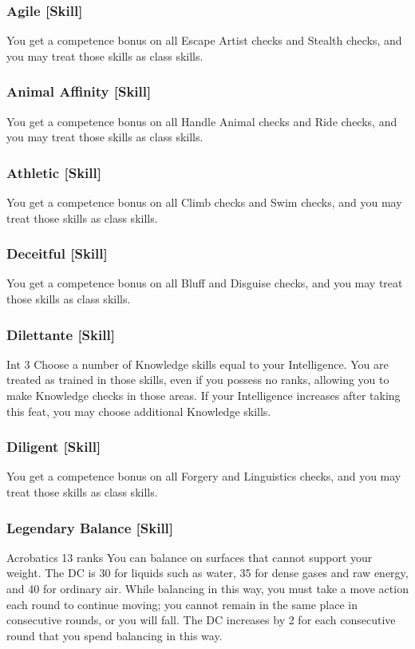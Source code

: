 \subsubsection{Agile [Skill]}
 You get a  competence bonus on all Escape Artist checks and Stealth checks, and you may treat those skills as class skills.

\subsubsection{Animal Affinity [Skill]}
 You get a  competence bonus on all Handle Animal checks and Ride checks, and you may treat those skills as class skills.

\subsubsection{Athletic [Skill]}
 You get a  competence bonus on all Climb checks and Swim checks, and you may treat those skills as class skills.

\subsubsection{Deceitful [Skill]}
 You get a  competence bonus on all Bluff and Disguise checks, and you may treat those skills as class skills.

\subsubsection{Dilettante [Skill]}
 Int 3
 Choose a number of Knowledge skills equal to your Intelligence. You are treated as trained in those skills, even if you possess no ranks, allowing you to make Knowledge checks in those areas. If your Intelligence increases after taking this feat, you may choose additional Knowledge skills.

\subsubsection{Diligent [Skill]}
 You get a  competence bonus on all Forgery and Linguistics checks, and you may treat those skills as class skills.

\subsubsection{Legendary Balance [Skill]}
\featpre Acrobatics 13 ranks
\featben You can balance on surfaces that cannot support your weight. The DC is 30 for liquids such as water, 35 for dense gases and raw energy, and 40 for ordinary air. While balancing in this way, you must take a move action each round to continue moving; you cannot remain in the same place in consecutive rounds, or you will fall. The DC increases by 2 for each consecutive round that you spend balancing in this way.

